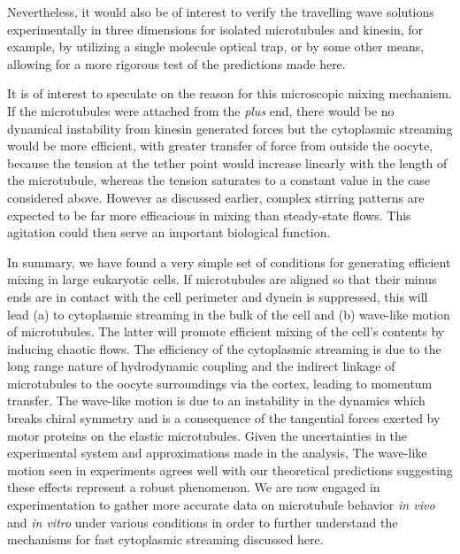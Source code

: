 \documentclass[11pt]{ucthesis}
\begin{document}
Nevertheless, it would also be of interest to verify the travelling wave solutions experimentally
in three dimensions for isolated
microtubules and kinesin, for example, by utilizing a single molecule optical trap, or by some other
means, allowing for a more rigorous test of the predictions made here.


It is of interest to speculate on the reason for this microscopic mixing
mechanism.  If the microtubules were attached from the {\em plus} end,
there would be no dynamical instability from kinesin generated forces
but the cytoplasmic streaming would be more efficient, with greater transfer
of force from outside the oocyte, because the tension at the
tether point would increase linearly with the length of the microtubule,
whereas the tension saturates to a constant value in the case considered
above. However as discussed earlier, complex stirring patterns are
expected to be far more efficacious in mixing than steady-state flows.
This agitation could then serve an important biological function.


In summary, we have found a very simple set of conditions for generating efficient mixing
in large eukaryotic cells. If microtubules are aligned so that their minus ends
are in contact with the cell perimeter and dynein is suppressed, this will lead 
(a) to cytoplasmic streaming in the bulk of the cell and (b) wave-like motion of
microtubules. The latter will promote efficient mixing of the cell's contents by
inducing chaotic flows.
The efficiency of the cytoplasmic streaming is due to the long range nature of
hydrodynamic coupling and the indirect linkage of microtubules to the oocyte surroundings via the cortex, leading to momentum transfer.
The wave-like motion is due to an instability in the dynamics which breaks chiral
symmetry and is a consequence of the tangential forces exerted by motor proteins on the elastic
microtubules. Given the uncertainties in the experimental system and approximations
made in the analysis, The wave-like motion seen in experiments agrees well with our theoretical predictions
suggesting these effects represent a robust phenomenon.
We are now engaged in experimentation to gather more accurate data on microtubule behavior 
{\em in vivo} and {\em in vitro} under various conditions in order to further understand
the mechanisms for fast cytoplasmic streaming discussed here.

\end{document}
